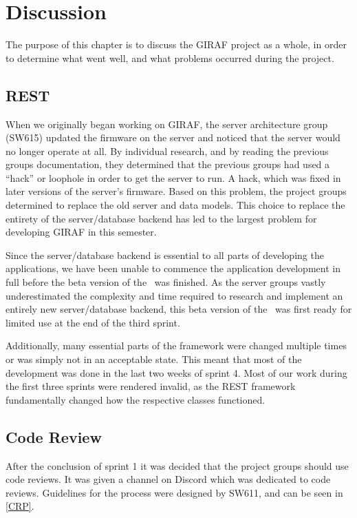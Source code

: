 \chapter{Discussion}
The purpose of this chapter is to discuss the GIRAF project as a whole, in order
to determine what went well, and what problems occurred during the project.

\section{REST}
When we originally began working on GIRAF, the server
architecture group (SW615) updated the firmware on the server and noticed that
the server would no longer operate at all. By individual research, and by
reading the previous groups documentation, they determined that the previous
groups had used a ``hack'' or loophole in order to get the server to run. A
hack, which was fixed in later versions of the server's firmware. Based on this
problem, the project groups determined to replace the old
server and data models. This choice to replace the entirety of
the server/database backend has led to the largest problem for developing GIRAF
in this semester.\nl

Since the server/database backend is essential to all parts of developing the
applications, we have been unable to commence the application development in
full before the beta version of the \rlib\ was finished. As the server groups
vastly underestimated the complexity and time required to research and
implement an entirely new server/database backend, this beta version of the
\rlib\ was first ready for limited use at the end of the third sprint.\nl

Additionally, many essential parts of the framework were changed multiple times
or was simply not in an acceptable state. This meant that most of the
development was done in the last two weeks of sprint 4. Most of our work
during the first three sprints were rendered invalid, as the REST framework
fundamentally changed how the respective classes functioned.

\section{Code Review}
After the conclusion of sprint 1 it was decided that the project groups should
use code reviews. It was given a channel on Discord which was dedicated to code
reviews. Guidelines for the process were designed by SW611, and can be seen
in \autoref{CRP}.\nl


